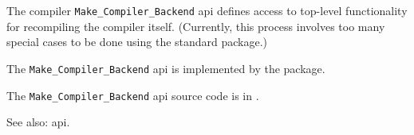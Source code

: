 
The compiler {\tt Make\_Compiler\_Backend} api defines access to top-level functionality 
for recompiling the compiler itself.  (Currently, this process involves too many 
special cases to be done using the standard  package.)

The {\tt Make\_Compiler\_Backend} api is implemented by the  package.

The {\tt Make\_Compiler\_Backend} api source code is in .

See also:   api.


